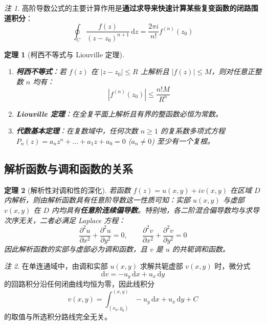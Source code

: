 \documentclass[11pt,a4paper,fontset=fandol]{ctexart}
\newtheorem{theorem}{定理}[section]
\theoremstyle{remark}
\newtheorem{remark}{注}[section]
\begin{document}
\begin{remark}
高阶导数公式的主要计算作用是\textbf{通过求导来快速计算某些复变函数的闭路围道积分}：
\begin{equation}
    \oint_C \frac{f(z)}{(z - z_0)^{n+1}}\,\mathrm{d}z = \frac{2\pi i}{n!} f^{(n)}(z_0)
\end{equation}
\end{remark}

\begin{theorem}[柯西不等式与 Liouville 定理]
\begin{enumerate}
    \item \textbf{柯西不等式}：若 $f(z)$ 在 $|z - z_0| \le R$ 上解析且 $|f(z)| \le M$，则对任意正整数 $n$ 均有：
    \begin{equation}
        |f^{(n)}(z_0)| \le \frac{n! M}{R^n}
    \end{equation}
    \item \textbf{Liouville 定理}：在全复平面上解析且有界的整函数必恒为常数。
    \item \textbf{代数基本定理}：在复数域中，任何次数 $n \ge 1$ 的复系数多项式方程 $P_n(z) = a_n z^n + \dots + a_1 z + a_0 = 0$ ($a_n \neq 0$) 至少有一个复根。
\end{enumerate}
\end{theorem}

\subsection{解析函数与调和函数的关系}

\begin{theorem}[解析性对调和性的深化]
若函数 $f(z) = u(x, y) + i v(x, y)$ 在区域 $D$ 内解析，则由解析函数具有任意阶导数这一性质可知：实部 $u(x, y)$ 与虚部 $v(x, y)$ 在 $D$ 内均具有\textbf{任意阶连续偏导数}。特别地，各二阶混合偏导数均与求导次序无关，二者必满足 Laplace 方程：
\begin{equation}
    \frac{\partial^2 u}{\partial x^2} + \frac{\partial^2 u}{\partial y^2} = 0, \qquad \frac{\partial^2 v}{\partial x^2} + \frac{\partial^2 v}{\partial y^2} = 0
\end{equation}
因此解析函数的实部与虚部必为调和函数，且 $v$ 是 $u$ 的共轭调和函数。
\end{theorem}

\begin{remark}
在单连通域中，由调和实部 $u(x, y)$ 求解共轭虚部 $v(x, y)$ 时，微分式
\begin{equation}
    \mathrm{d}v = -u_y\,\mathrm{d}x + u_x\,\mathrm{d}y
\end{equation}
的回路积分沿任何闭曲线均恒为零，因此线积分
\begin{equation}
    v(x, y) = \int_{(x_0, y_0)}^{(x, y)} -u_y\,\mathrm{d}x + u_x\,\mathrm{d}y + C
\end{equation}
的取值与所选积分路线完全无关。
\end{remark}
\end{document}
